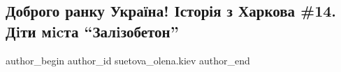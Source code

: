  
 
 
 
 
 
\subsection{Доброго ранку Україна! Історія з Харкова \#14. Дiти мicта \enquote{Залiзобетон}}
\label{sec:27_04_2022.fb.suetova_olena.kiev.1.istoria_v_harkova_14}
 
\ifcmt
 author_begin
   author_id suetova_olena.kiev
 author_end
\fi
